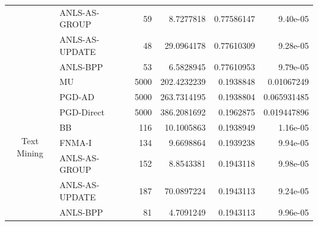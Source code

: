 \documentclass[conference,onecolumn,12pt]{IEEEtran}
\numberwithin{equation}{section}
\numberwithin{figure}{section}
\numberwithin{table}{section}
\theoremstyle{definition}
\begin{document}
\begin{table}[htbp]
\begin{tabular}{clrrrr}
			& ANLS-AS-GROUP & 59    & 8.7277818 & 0.77586147 & 9.40e-05 \\
			& ANLS-AS-UPDATE & 48    & 29.0964178 & 0.77610309 & 9.28e-05 \\
			& ANLS-BPP & 53    & 6.5828945 & 0.77610953 & 9.79e-05 \\
			\midrule
			\multirow{8}[0]{*}{Text Mining} & MU    & 5000  & 202.4232239 & 0.1938848 & 0.01067249 \\
			& PGD-AD & 5000  & 263.7314195 & 0.1938804 & 0.065931485 \\
			& PGD-Direct & 5000  & 386.2081692 & 0.1962875 & 0.019447896 \\
			& BB    & 116   & 10.1005863 & 0.1938949 & 1.16e-05 \\
			& FNMA-I & 134   & 9.6698864 & 0.1939238 & 9.94e-05 \\
			& ANLS-AS-GROUP & 152   & 8.8543381 & 0.1943118 & 9.98e-05 \\
			& ANLS-AS-UPDATE & 187   & 70.0897224 & 0.1943113 & 9.24e-05 \\
			& ANLS-BPP & 81    & 4.7091249 & 0.1943113 & 9.96e-05 \\
	  
			\bottomrule

	  \end{tabular}%
	\label{tab:addlabel}%
  \end{table}%
\clearpage



\end{document}
